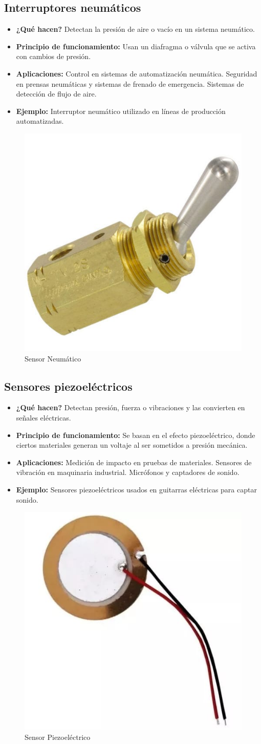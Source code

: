 \subsection*{Interruptores neumáticos}
\begin{itemize}
	\item \textbf{¿Qué hacen?} Detectan la presión de aire o vacío en un sistema neumático.
	\item \textbf{Principio de funcionamiento:} Usan un diafragma o válvula que se activa con cambios de presión.
	\item \textbf{Aplicaciones:} Control en sistemas de automatización neumática.
	Seguridad en prensas neumáticas y sistemas de frenado de emergencia.
	Sistemas de detección de flujo de aire.
	\item \textbf{Ejemplo:} Interruptor neumático utilizado en líneas de producción automatizadas.
\end{itemize}
\begin{figure}[h]
	\centering
	\includegraphics[width=0.2\linewidth]{img/sensor neumatico}
	\caption{Sensor Neumático}
	\label{fig:sensor neumatico}
\end{figure}

\subsection*{Sensores piezoeléctricos}
\begin{itemize}
	\item \textbf{¿Qué hacen?} Detectan presión, fuerza o vibraciones y las convierten en señales eléctricas.
	\item \textbf{Principio de funcionamiento:} Se basan en el efecto piezoeléctrico, donde ciertos materiales generan un voltaje al ser sometidos a presión mecánica.
	\item \textbf{Aplicaciones:} Medición de impacto en pruebas de materiales.
	Sensores de vibración en maquinaria industrial.
	Micrófonos y captadores de sonido.
	\item \textbf{Ejemplo:} Sensores piezoeléctricos usados en guitarras eléctricas para captar sonido.
	\cite{carletti_sensores_2025}
\end{itemize}
\begin{figure}[h]
	\centering
	\includegraphics[width=0.2\linewidth]{img/sensor piezoelectrico}
	\caption{Sensor Piezoeléctrico}
	\label{fig:sensor piezoelectrico}
\end{figure}

